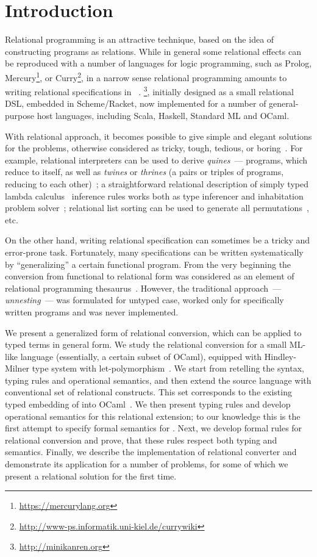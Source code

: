 \section{Introduction}
\label{intro}

Relational programming is an attractive technique, based on the idea of constructing programs as relations.
While in general some relational effects can be reproduced with a number of languages for logic programming, such as
Prolog, Mercury\footnote{\url{https://mercurylang.org}}, or Curry\footnote{\url{http://www-ps.informatik.uni-kiel.de/currywiki}}, in
a narrow sense relational programming amounts to writing relational specifications in \miniKanren~\cite{TRS,MicroKanren}. \miniKanren\footnote{\url{http://minikanren.org}},
initially designed as a small relational DSL, embedded in Scheme/Racket, now implemented for a number of general-purpose host languages,
including Scala, Haskell, Standard ML and OCaml.

With relational approach, it becomes possible to give simple and elegant solutions for the problems, otherwise
considered as tricky, tough, tedious, or boring~\cite{unified}. For example, relational interpreters can be used to derive
\emph{quines}~--- programs, which reduce to itself, as well as \emph{twines} or \emph{thrines} (a pairs or triples of
programs, reducing to each other)~\cite{Untagged}; a straightforward relational description of
simply typed lambda calculus~\cite{Lambda} inference rules works both as type inferencer and inhabitation problem solver~\cite{WillThesis};
relational list sorting can be used to generate all permutations~\cite{ocanren}, etc. 

On the other hand, writing relational specification can sometimes be a tricky and error-prone task. Fortunately, many 
specifications can be written systematically by ``generalizing'' a certain functional program. From the very beginning 
the conversion from functional to relational form was considered as an element of relational programming thesaurus~\cite{TRS}. However,
the traditional approach~--- \emph{unnesting}~--- was formulated for untyped case, worked only for specifically written
programs and was never implemented.

We present a generalized form of relational conversion, which can be applied to typed terms in general form. We study the relational conversion 
for a small ML-like language (essentially, a certain subset of OCaml), equipped with Hindley-Milner type system with let-polymorphism~\cite{Types}. 
We start from retelling the syntax, typing rules and operational semantics, and then extend the source language with conventional set of 
relational constructs. This set corresponds to the existing typed embedding of \miniKanren into OCaml~\cite{ocanren}. We then present typing rules and 
develop operational semantics for this relational extension; to our knowledge this is the first attempt to specify formal semantics for
\miniKanren. Next, we develop formal rules for relational conversion and prove, that these rules respect both typing and
semantics. Finally, we describe the implementation of relational converter and demonstrate its application for a number of problems, for some
of which we present a relational solution for the first time.
